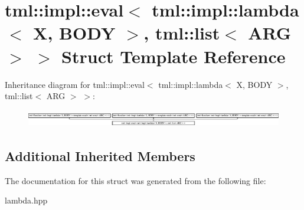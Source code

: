 \hypertarget{structtml_1_1impl_1_1eval_3_01tml_1_1impl_1_1lambda_3_01X_00_01BODY_01_4_00_01tml_1_1list_3_01ARG_01_4_01_4}{\section{tml\+:\+:impl\+:\+:eval$<$ tml\+:\+:impl\+:\+:lambda$<$ X, B\+O\+D\+Y $>$, tml\+:\+:list$<$ A\+R\+G $>$ $>$ Struct Template Reference}
\label{structtml_1_1impl_1_1eval_3_01tml_1_1impl_1_1lambda_3_01X_00_01BODY_01_4_00_01tml_1_1list_3_01ARG_01_4_01_4}
}
Inheritance diagram for tml\+:\+:impl\+:\+:eval$<$ tml\+:\+:impl\+:\+:lambda$<$ X, B\+O\+D\+Y $>$, tml\+:\+:list$<$ A\+R\+G $>$ $>$\+:\begin{figure}[H]
\begin{center}
\leavevmode
\includegraphics[height=0.771350cm]{structtml_1_1impl_1_1eval_3_01tml_1_1impl_1_1lambda_3_01X_00_01BODY_01_4_00_01tml_1_1list_3_01ARG_01_4_01_4}
\end{center}
\end{figure}
\subsection*{Additional Inherited Members}


The documentation for this struct was generated from the following file\+:\begin{DoxyCompactItemize}
\item 
lambda.\+hpp\end{DoxyCompactItemize}
